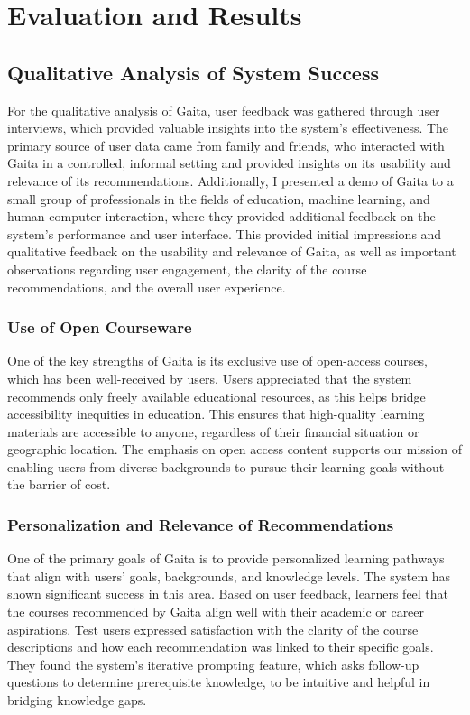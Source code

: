 \chapter{Evaluation and Results} \label{chap:chap-5}



\section{Qualitative Analysis of System Success}

For the qualitative analysis of Gaita, user feedback was gathered through user interviews, which provided valuable insights into the system’s effectiveness. The primary source of user data came from family and friends, who interacted with Gaita in a controlled, informal setting and provided insights on its usability and relevance of its recommendations. Additionally, I presented a demo of Gaita to a small group of professionals in the fields of education, machine learning, and human computer interaction, where they provided additional feedback on the system’s performance and user interface. This provided initial impressions and qualitative feedback on the usability and relevance of Gaita, as well as important observations regarding user engagement, the clarity of the course recommendations, and the overall user experience.


\subsection{Use of Open Courseware}

One of the key strengths of Gaita is its exclusive use of open-access courses, which has been well-received by users. Users appreciated that the system recommends only freely available educational resources, as this helps bridge accessibility inequities in education. This ensures that high-quality learning materials are accessible to anyone, regardless of their financial situation or geographic location. The emphasis on open access content supports our mission of enabling users from diverse backgrounds to pursue their learning goals without the barrier of cost. 

\subsection{Personalization and Relevance of Recommendations} 

One of the primary goals of Gaita is to provide personalized learning pathways that align with users’ goals, backgrounds, and knowledge levels. The system has shown significant success in this area. Based on user feedback, learners feel that the courses recommended by Gaita align well with their academic or career aspirations. Test users expressed satisfaction with the clarity of the course descriptions and how each recommendation was linked to their specific goals. They found the system's iterative prompting feature, which asks follow-up questions to determine prerequisite knowledge, to be intuitive and helpful in bridging knowledge gaps. 

